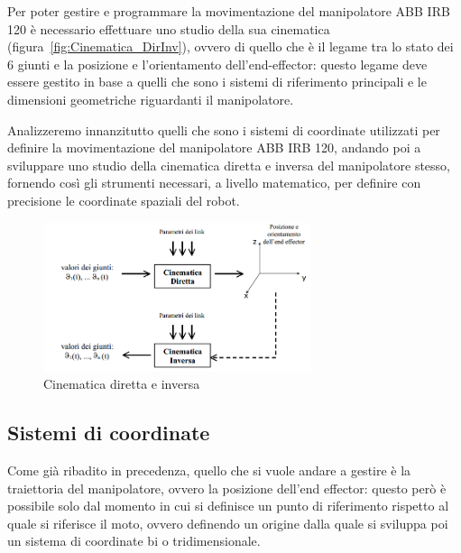 Per poter gestire e programmare la movimentazione del manipolatore ABB IRB 120 è necessario effettuare uno studio della sua cinematica (figura~\vref{fig:Cinematica_DirInv}), ovvero di quello che è il legame tra lo stato dei 6 giunti e la posizione e l'orientamento dell'end-effector: questo legame deve essere gestito in base a quelli che sono i sistemi di riferimento principali e le dimensioni geometriche riguardanti il manipolatore.

Analizzeremo innanzitutto quelli che sono i sistemi di coordinate utilizzati per definire la movimentazione del manipolatore ABB IRB 120, andando poi a sviluppare uno studio della cinematica diretta e inversa del manipolatore stesso, fornendo così gli strumenti necessari, a livello matematico, per definire con precisione le coordinate spaziali del robot.

\begin{figure}[h]
	\centering
	\includegraphics[width=0.7\textwidth]{Immagini/Cinematica_inv_dir_scheme}
	\caption{Cinematica diretta e inversa\cite{rep:Slide_Brugali1}}
	\label{fig:Cinematica_DirInv}
\end{figure}



\subsection{Sistemi di coordinate}

Come già ribadito in precedenza, quello che si vuole andare a gestire è la traiettoria del manipolatore, ovvero la posizione dell'end effector: questo però è possibile solo dal momento in cui si definisce un punto di riferimento rispetto al quale si riferisce il moto, ovvero definendo un origine dalla quale si sviluppa poi un sistema di coordinate bi o tridimensionale. 

